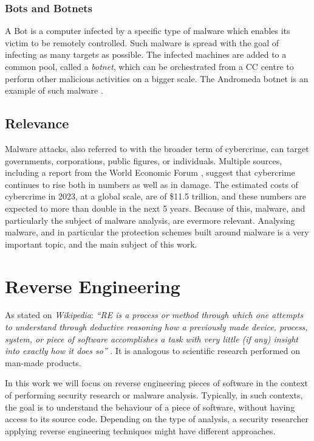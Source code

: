 \subsubsection{Bots and Botnets}

A Bot is a computer infected by a specific type of malware which enables its victim to be remotely controlled. Such malware is spread with the goal of infecting as many targets as possible. The infected machines are added to a common pool, called a \emph{botnet}, which can be orchestrated from a \gls{CC} centre to perform other malicious activities on a bigger scale. The Andromeda botnet is an example of such malware \cite{andromeda} \cite{kaspersky_malware_types}.

\subsection{Relevance}

Malware attacks, also referred to with the broader term of cybercrime, can target governments, corporations, public figures, or individuals. Multiple sources, including a report from the World Economic Forum \cite{wef_cybercrime}, suggest that cybercrime continues to rise both in numbers as well as in damage. The estimated costs of cybercrime in 2023, at a global scale, are of \$11.5 trillion, and these numbers are expected to more than double in the next 5 years. Because of this, malware, and particularly the subject of malware analysis, are evermore relevant. Analysing malware, and in particular the protection schemes built around malware is a very important topic, and the main subject of this work.

\section{Reverse Engineering}
\label{sec:reverse_engineering}

As stated on \emph{Wikipedia}: \emph{``\gls{RE} is a process or method through which one attempts to understand through deductive reasoning how a previously made device, process, system, or piece of software accomplishes a task with very little (if any) insight into exactly how it does so''} \cite{re_wiki}. It is analogous to scientific research performed on man-made products.

In this work we will focus on reverse engineering pieces of software in the context of performing security research or malware analysis. Typically, in such contexts, the goal is to understand the behaviour of a piece of software, without having access to its source code. Depending on the type of analysis, a security researcher applying reverse engineering techniques might have different approaches. 

